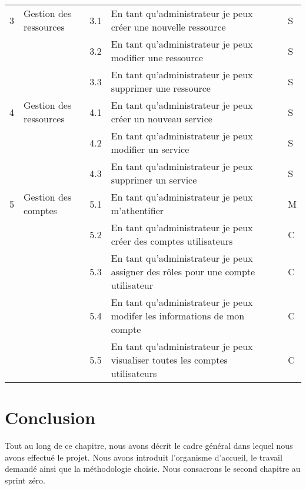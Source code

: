 \begin{longtable}{| p{1.5cm}  | p{2cm} | p{1.5cm} | p{6cm} | p{1cm} |  p{1.5cm} |}
3 & Gestion des ressources & 3.1 & En tant qu'administrateur je peux créer une nouvelle ressource & & S \\ \cline{3-6}
& & 3.2 & En tant qu'administrateur je peux modifier une ressource & & S \\ \cline{3-6}
& & 3.3 & En tant qu'administrateur je peux supprimer une ressource & & S \\ \hline


4 & Gestion des ressources & 4.1 & En tant qu'administrateur je peux créer un nouveau service & & S \\ \cline{3-6}
& & 4.2 & En tant qu'administrateur je peux modifier un service & & S \\ \cline{3-6}
& & 4.3 & En tant qu'administrateur je peux supprimer un service & & S \\ \hline

5 & Gestion des comptes & 5.1 & En tant qu'administrateur je peux m'athentifier & ~ & M \\ \cline{3-6}
& & 5.2 & En tant qu'administrateur je peux créer des comptes utilisateurs & ~ & C \\ \cline{3-6}
& & 5.3 & En tant qu'administrateur je peux assigner des rôles pour une compte utilisateur & ~ & C \\ \cline{3-6}
& & 5.4 & En tant qu'administrateur je peux modifer les informations de mon compte & ~ & C \\ \cline{3-6}
& & 5.5 & En tant qu'administrateur je peux visualiser toutes les comptes utilisateurs & ~ & C \\ \hline
\end{longtable}

\section*{Conclusion}
Tout au long de ce chapitre, nous avons décrit le cadre général dans lequel nous avons effectué le projet. Nous avons introduit l’organisme d’accueil, le travail demandé ainsi que la méthodologie choisie. Nous consacrons le second chapitre au sprint zéro.